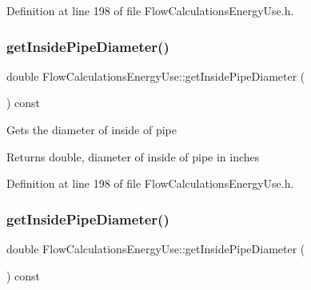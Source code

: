 Definition at line 198 of file Flow\+Calculations\+Energy\+Use.\+h.

\mbox{\label{class_flow_calculations_energy_use_a9042dce2938208358fe38ed8a726ca65}} 
\subsubsection{\texorpdfstring{get\+Inside\+Pipe\+Diameter()}{getInsidePipeDiameter()}\hspace{0.1cm}{\footnotesize\ttfamily [2/3]}}
{\footnotesize\ttfamily double Flow\+Calculations\+Energy\+Use\+::get\+Inside\+Pipe\+Diameter (\begin{DoxyParamCaption}{ }\end{DoxyParamCaption}) const\hspace{0.3cm}{\ttfamily [inline]}}

Gets the diameter of inside of pipe

\begin{DoxyReturn}{Returns}
double, diameter of inside of pipe in inches 
\end{DoxyReturn}


Definition at line 198 of file Flow\+Calculations\+Energy\+Use.\+h.

\mbox{\label{class_flow_calculations_energy_use_a9042dce2938208358fe38ed8a726ca65}} 
\subsubsection{\texorpdfstring{get\+Inside\+Pipe\+Diameter()}{getInsidePipeDiameter()}\hspace{0.1cm}{\footnotesize\ttfamily [3/3]}}
{\footnotesize\ttfamily double Flow\+Calculations\+Energy\+Use\+::get\+Inside\+Pipe\+Diameter (\begin{DoxyParamCaption}{ }\end{DoxyParamCaption}) const\hspace{0.3cm}{\ttfamily [inline]}}

